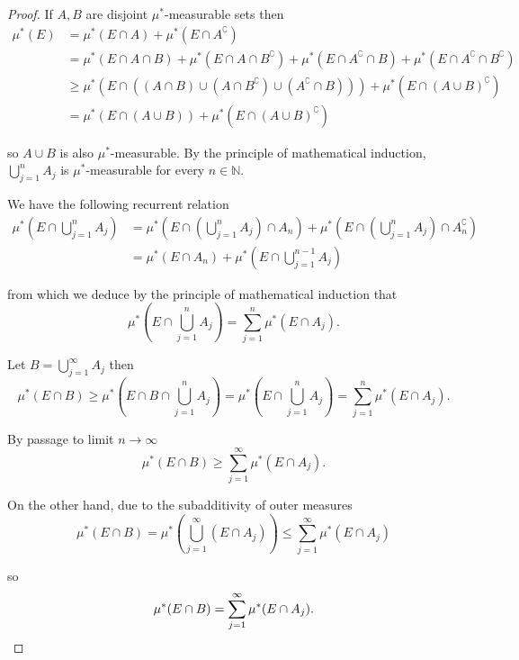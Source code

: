 \begin{proof}
    If \( A, B \) are disjoint \( \mu^{\ast} \)-measurable sets then
    \begingroup
    \allowdisplaybreaks%
    \begin{align*}
        \mu^{\ast}(E) & = \mu^{\ast}(E \cap A) + \mu^{\ast}(E \cap A^{\complement})                                                                                                                     \\
                      & = \mu^{\ast}(E \cap A \cap B) + \mu^{\ast}(E \cap A \cap B^{\complement}) + \mu^{\ast}(E \cap A^{\complement} \cap B) + \mu^{\ast}(E \cap A^{\complement} \cap B^{\complement}) \\
                      & \ge \mu^{\ast}\left( E \cap \left( (A \cap B) \cup (A \cap B^{\complement}) \cup (A^{\complement} \cap B) \right) \right) + \mu^{\ast}(E \cap {(A \cup B)}^{\complement})       \\
                      & = \mu^{\ast}(E \cap (A \cup B)) + \mu^{\ast}(E \cap {(A \cup B)}^{\complement})
    \end{align*}
    \endgroup

    so \( A \cup B \) is also \( \mu^{\ast} \)-measurable. By the principle of mathematical induction, \( \bigcup_{j=1}^{n} A_{j} \) is \( \mu^{\ast} \)-measurable for every \( n \in \mathbb{N} \).

    We have the following recurrent relation
    \begingroup
    \allowdisplaybreaks%
    \begin{align*}
        \mu^{\ast}\left( E \cap \bigcup_{j=1}^{n} A_{j} \right) & = \mu^{\ast}\left( E \cap \left(\bigcup_{j=1}^{n} A_{j}\right) \cap A_{n} \right) + \mu^{\ast}\left( E \cap \left(\bigcup_{j=1}^{n} A_{j}\right) \cap A_{n}^{\complement} \right) \\
                                                                & = \mu^{\ast}\left( E \cap A_{n} \right) + \mu^{\ast}\left( E \cap \bigcup_{j=1}^{n-1} A_{j} \right)
    \end{align*}
    \endgroup

    from which we deduce by the principle of mathematical induction that
    \[
        \mu^{\ast}\left( E \cap \bigcup_{j=1}^{n} A_{j} \right) = \sum_{j=1}^{n} \mu^{\ast}(E \cap A_{j}).
    \]

    Let \( B = \bigcup_{j=1}^{\infty} A_{j} \) then
    \[
        \mu^{\ast}(E \cap B) \ge \mu^{\ast}\left(E \cap B \cap \bigcup_{j=1}^{n} A_{j}\right) = \mu^{\ast}\left( E \cap \bigcup_{j=1}^{n} A_{j} \right) = \sum_{j=1}^{n} \mu^{\ast}(E \cap A_{j}).
    \]

    By passage to limit \( n \to \infty \)
    \[
        \mu^{\ast}(E \cap B) \ge \sum_{j=1}^{\infty} \mu^{\ast}(E \cap A_{j}).
    \]

    On the other hand, due to the subadditivity of outer measures
    \[
        \mu^{\ast}(E \cap B) = \mu^{\ast}\left( \bigcup_{j=1}^{\infty}(E \cap A_{j}) \right) \le \sum_{j=1}^{\infty} \mu^{\ast}(E \cap A_{j})
    \]

    so
    \[
        \mu^{\ast}(E \cap B) = \sum_{j=1}^{\infty} \mu^{\ast}(E \cap A_{j}). \qedhere
    \]
\end{proof}

